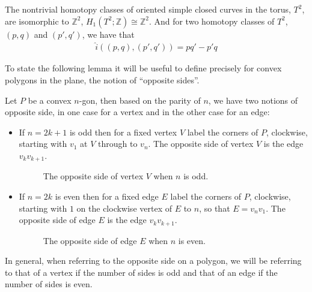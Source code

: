 \begin{proposition} \label{prop:AI-num-torus}
The nontrivial homotopy classes of oriented simple closed curves in the torus, $T^2$, are isomorphic to $\mathbb{Z}^2$, $H_1(T^2;\mathbb{Z}) \cong \mathbb{Z}^2$. And for two homotopy classes of $T^2$, $(p, q)$ and $(p', q')$, we have that 
\begin{align*}
\widehat{i}((p, q),(p', q')) = pq' - p'q
\end{align*}
\end{proposition}

\noindent To state the following lemma it will be useful to define precisely for convex polygons in the plane, the notion of “opposite sides”.
\begin{definition}
Let $P$ be a convex $n$-gon, then based on the parity of $n$, we have two notions of opposite side, in one case for a vertex and in the other case for an edge:
\begin{itemize}
    \item If $n=2k+1$ is odd then for a fixed vertex $V$ label the corners of $P$, clockwise, starting with $v_1$ at $V$ through to $v_n$. The opposite side of vertex $V$ is the edge $v_{k}v_{k+1}$.
    \begin{figure}[ht]
        \centering
        
        \caption{The opposite side of vertex $V$ when $n$ is odd.}
    \end{figure}
    \FloatBarrier
    
    \item If $n=2k$ is even then for a fixed edge $E$ label the corners of $P$, clockwise, starting with $1$ on the clockwise vertex of $E$ to $n$, so that $E=v_nv_1$. The opposite side of edge $E$ is the edge $v_{k}v_{k+1}$.
    \begin{figure}[ht]
        \centering
        
        \caption{The opposite side of edge $E$ when $n$ is even.}
    \end{figure}
    \FloatBarrier
\end{itemize}
In general, when referring to the opposite side on a polygon, we will be referring to that of a vertex if the number of sides is odd and that of an edge if the number of sides is even.
\end{definition}

